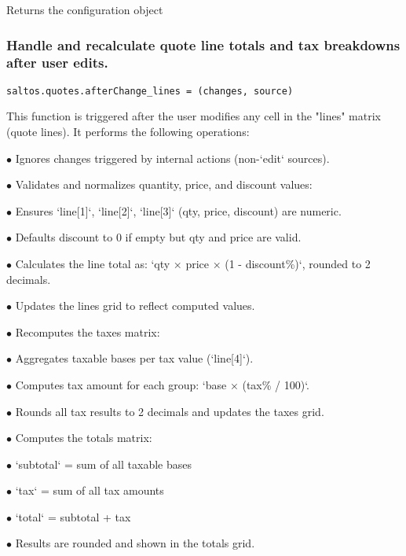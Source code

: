 \documentclass[a4paper]{article}
\begin{document}
Returns the configuration object

\hypertarget{toc47}{}
\subsubsection{Handle and recalculate quote line totals and tax breakdowns after user edits.}

\begin{lstlisting}
saltos.quotes.afterChange_lines = (changes, source)
\end{lstlisting}

This function is triggered after the user modifies any cell in the "lines" matrix
(quote lines). It performs the following operations:

\begin{compactitem}
\item[\color{myblue}$\bullet$] Ignores changes triggered by internal actions (non-`edit` sources).
\item[\color{myblue}$\bullet$] Validates and normalizes quantity, price, and discount values:
    \begin{compactitem}
    \item[\color{myblue}$\bullet$] Ensures `line[1]`, `line[2]`, `line[3]` (qty, price, discount) are numeric.
    \item[\color{myblue}$\bullet$] Defaults discount to 0 if empty but qty and price are valid.
    \end{compactitem}
\item[\color{myblue}$\bullet$] Calculates the line total as: `qty × price × (1 - discount\%)`, rounded to 2 decimals.
\item[\color{myblue}$\bullet$] Updates the lines grid to reflect computed values.
\item[\color{myblue}$\bullet$] Recomputes the taxes matrix:
    \begin{compactitem}
    \item[\color{myblue}$\bullet$] Aggregates taxable bases per tax value (`line[4]`).
    \item[\color{myblue}$\bullet$] Computes tax amount for each group: `base × (tax\% / 100)`.
    \end{compactitem}
\item[\color{myblue}$\bullet$] Rounds all tax results to 2 decimals and updates the taxes grid.
\item[\color{myblue}$\bullet$] Computes the totals matrix:
    \begin{compactitem}
    \item[\color{myblue}$\bullet$] `subtotal` = sum of all taxable bases
    \item[\color{myblue}$\bullet$] `tax` = sum of all tax amounts
    \item[\color{myblue}$\bullet$] `total` = subtotal + tax
    \item[\color{myblue}$\bullet$] Results are rounded and shown in the totals grid.
    \end{compactitem}
\end{compactitem}
\end{document}
